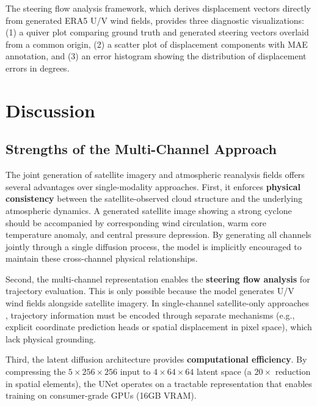 The steering flow analysis framework, which derives displacement vectors directly from generated ERA5 U/V wind fields, provides three diagnostic visualizations: (1) a quiver plot comparing ground truth and generated steering vectors overlaid from a common origin, (2) a scatter plot of displacement components with MAE annotation, and (3) an error histogram showing the distribution of displacement errors in degrees.

\section{Discussion}

\subsection{Strengths of the Multi-Channel Approach}

The joint generation of satellite imagery and atmospheric reanalysis fields offers several advantages over single-modality approaches. First, it enforces \textbf{physical consistency} between the satellite-observed cloud structure and the underlying atmospheric dynamics. A generated satellite image showing a strong cyclone should be accompanied by corresponding wind circulation, warm core temperature anomaly, and central pressure depression. By generating all channels jointly through a single diffusion process, the model is implicitly encouraged to maintain these cross-channel physical relationships.

Second, the multi-channel representation enables the \textbf{steering flow analysis} for trajectory evaluation. This is only possible because the model generates U/V wind fields alongside satellite imagery. In single-channel satellite-only approaches \cite{nath2024forecasting, ren2025improving}, trajectory information must be encoded through separate mechanisms (e.g., explicit coordinate prediction heads or spatial displacement in pixel space), which lack physical grounding.

Third, the latent diffusion architecture provides \textbf{computational efficiency}. By compressing the $5 \times 256 \times 256$ input to $4 \times 64 \times 64$ latent space (a $20\times$ reduction in spatial elements), the UNet operates on a tractable representation that enables training on consumer-grade GPUs (16GB VRAM).

